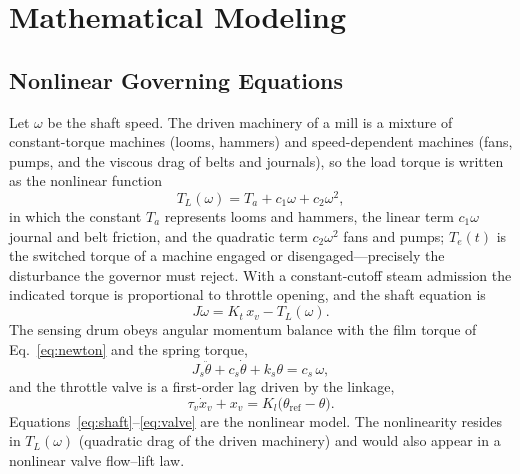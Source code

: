 \documentclass[conference]{IEEEtran}
\begin{document}
\section{Mathematical Modeling}\label{sec:model}
\subsection{Nonlinear Governing Equations}
Let $\omega$ be the shaft speed. The driven machinery of a mill is a mixture of
constant-torque machines (looms, hammers) and speed-dependent machines (fans,
pumps, and the viscous drag of belts and journals), so the load torque is written as
the nonlinear function
\begin{equation}
T_L(\omega)=T_a+c_1\omega+c_2\omega^{2},
\label{eq:TL}
\end{equation}
in which the constant $T_a$ represents looms and hammers, the linear term
$c_1\omega$ journal and belt friction, and the quadratic term $c_2\omega^{2}$ fans
and pumps; $T_e(t)$ is the switched torque of a machine engaged or
disengaged---precisely the disturbance the governor must reject. With a
constant-cutoff steam
admission the indicated torque is proportional to throttle opening, and the shaft
equation is
\begin{equation}
J\dot\omega=K_t\,x_v-T_L(\omega).
\label{eq:shaft}
\end{equation}
The sensing drum obeys angular momentum balance with the film torque of
Eq.~\eqref{eq:newton} and the spring torque,
\begin{equation}
J_s\ddot\theta+c_s\dot\theta+k_s\theta=c_s\,\omega,
\label{eq:drum}
\end{equation}
and the throttle valve is a first-order lag driven by the linkage,
\begin{equation}
\tau_v\dot x_v+x_v=K_l\bigl(\theta_{\mathrm{ref}}-\theta\bigr).
\label{eq:valve}
\end{equation}
Equations~\eqref{eq:shaft}--\eqref{eq:valve} are the nonlinear model. The
nonlinearity resides in $T_L(\omega)$ (quadratic drag of the driven machinery) and
would also appear in a nonlinear valve flow--lift law.
\end{document}
